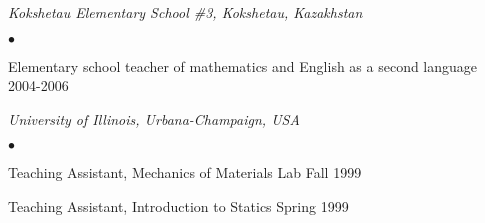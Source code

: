 \documentclass[margin,line]{res}
\newenvironment{list2}{
  \begin{list}{$\bullet$}{%
      \setlength{\itemsep}{0in}
      \setlength{\parsep}{0in} \setlength{\parskip}{0in}
      \setlength{\topsep}{0in} \setlength{\partopsep}{0in}
      \setlength{\leftmargin}{0.2in}}}{\end{list}}
\begin{document}
\begin{resume}
\emph{Kokshetau Elementary School \#3, Kokshetau, Kazakhstan}
\begin{list2}
\item Elementary school teacher of mathematics and English as a second language
\hfill 2004-2006
\end{list2}

\emph{University of Illinois, Urbana-Champaign, USA}
\begin{list2}
\item Teaching Assistant, Mechanics of Materials Lab \hfill Fall 1999
\item Teaching Assistant, Introduction to Statics \hfill Spring 1999
\end{list2}

\end{resume}
\end{document}
